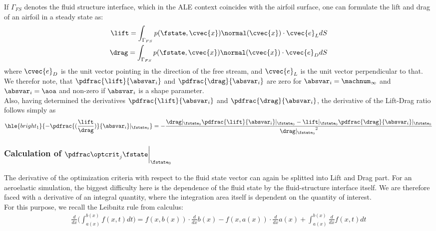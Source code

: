 \documentclass[../main.tex]{subfiles}
\begin{document}
If $\Gamma_{FS}$ denotes the fluid structure interface, which in the \ac{ALE} context coincides with the airfoil surface, one can formulate the lift and drag of an airfoil in a steady state as:
\begin{align}\label{eq:lift_and_drag_integrals}
\lift=\int_{\Gamma_{FS}} p(\fstate,\cvec{x}) \normal(\cvec{x})\cdot \cvec{e}_L dS \nonumber\\
\drag=\int_{\Gamma_{FS}} p(\fstate,\cvec{x}) \normal(\cvec{x})\cdot \cvec{e}_D dS \\
\end{align}
where $\cvec{e}_D$ is the unit vector pointing in the direction of the free stream, and $\cvec{e}_L$ is the unit vector perpendicular to that.
We therefor note, that $\pdfrac{\lift}{\absvar_i}$ and $\pdfrac{\drag}{\absvar_i}$ are zero for $\absvar_{i}=\machnum_{\infty}$ and $\absvar_{i}=\aoa$ and non-zero if $\absvar_{i}$ is a shape parameter.\\
Also, having determined the derivatives $\pdfrac{\lift}{\absvar_i}$ and $\pdfrac{\drag}{\absvar_i}$, the derivative of the Lift-Drag ratio follows simply as
\begin{align}\label{eq:lifttoddrag_by_absvar}
\hle{bright_1}{-\pdfrac{(\frac{\lift}{\drag})}{\absvar_i}\rvert_{\fstate_0}}=
-\frac{\drag\rvert_{\fstate_0} \pdfrac{\lift}{\absvar_i}\rvert_{\fstate_0} - \lift\rvert_{\fstate_0} \pdfrac{\drag}{\absvar_i}\rvert_{\fstate_0} }{{\drag\rvert_{\fstate_0}}^2}
\end{align}


\subsubsection{Calculation of $\PoptcritJBYfstate\bigg\rvert_{\fstate_0}$}
The derivative of the optimization criteria with respect to the fluid state vector can again be splitted into Lift and Drag part.
For an aeroelastic simulation, the biggest difficulty here is the dependence of the fluid state by the fluid-structure interface itself.
We are therefore faced with a derivative of an integral quantity, where the integration area itself is dependent on the quantity of interest.\\
For this purpose, we recall the Leibnitz rule from calculus:
\begin{align}\label{eq:leibnitz_rule}
\frac{d}{dx}\Big(\int_{a(x)}^{b(x)} f(x,t) dt \Big) =
f(x,b(x))\cdot \frac{d}{dx}b(x)-
f(x,a(x))\cdot \frac{d}{dx}a(x)+
\int_{a(x)}^{b(x)} \frac{d}{dx} f(x,t) dt
\end{align}
\end{document}
